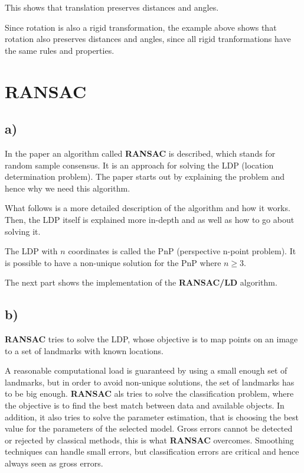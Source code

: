 \documentclass{article}
\begin{document}
  This shows that translation preserves distances and angles.

  Since rotation is also a rigid transformation, the example above shows that rotation also preserves distances and angles, since all rigid tranformations have the same rules and properties.

  \section{RANSAC}

  \subsection*{a)}

  In the paper an algorithm called \textbf{RANSAC} is described, which stands for random sample consensus. It is an approach for solving the LDP (location determination problem). The paper starts out by explaining the problem and hence why we need this algorithm.

  What follows is a more detailed description of the algorithm and how it works. Then, the LDP itself is explained more in-depth and as well as how to go about solving it.

  The LDP with $n$ coordinates is called the PnP (perspective n-point problem). It is possible to have a non-unique solution for the PnP where $n \geq 3$.

  The next part shows the implementation of the \textbf{RANSAC/LD} algorithm.

  \subsection*{b)}

  \textbf{RANSAC} tries to solve the LDP, whose objective is to map points on an image to a set of landmarks with known locations.

  A reasonable computational load is guaranteed by using a small enough set of landmarks, but in order to avoid non-unique solutions, the set of landmarks has to be big enough. \textbf{RANSAC} als tries to solve the classification problem, where the objective is to find the best match between data and available objects. In addition, it also tries to solve the parameter estimation, that is choosing the best value for the parameters of the selected model. Gross errors cannot be detected or rejected by classical methods, this is what \textbf{RANSAC} overcomes. Smoothing techniques can handle small errors, but classification errors are critical and hence always seen as gross errors.
\end{document}
